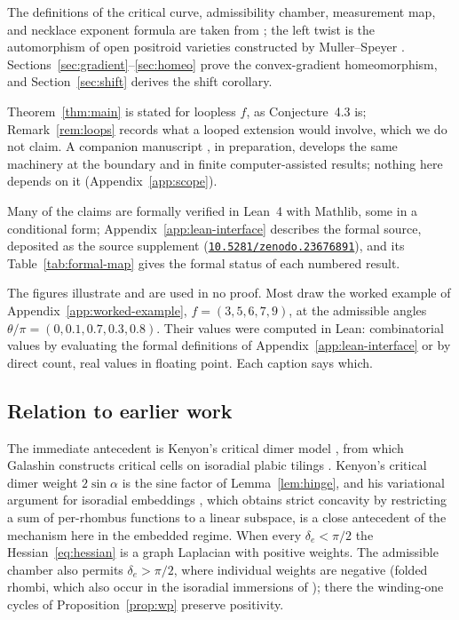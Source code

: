 \documentclass[11pt]{article}
\theoremstyle{definition}
\newcommand{\SourceSupplementRef}{\href{https://doi.org/10.5281/zenodo.23676891}{\nolinkurl{10.5281/zenodo.23676891}}}
\begin{document}
The definitions of the critical curve, admissibility chamber, measurement map, and necklace exponent
formula are taken from \cite{Galashin}; the left twist is the automorphism of open positroid varieties
constructed by Muller--Speyer \cite{MullerSpeyer}. Sections~\ref{sec:gradient}--\ref{sec:homeo} prove
the convex-gradient homeomorphism, and Section~\ref{sec:shift} derives the shift corollary.

Theorem~\ref{thm:main} is stated for loopless $f$, as Conjecture~4.3 is; Remark~\ref{rem:loops} records what a
looped extension would involve, which we do not claim. A companion manuscript \cite{GuetzBoundary}, in
preparation, develops the same machinery at the boundary and in finite computer-assisted results; nothing here
depends on it (Appendix~\ref{app:scope}).

Many of the claims are formally verified in Lean~4 with Mathlib, some in a conditional form;
Appendix~\ref{app:lean-interface} describes the formal source, deposited as the source supplement
(\SourceSupplementRef), and its Table~\ref{tab:formal-map} gives the formal status of each numbered result.

The figures illustrate and are used in no proof. Most draw the worked example of
Appendix~\ref{app:worked-example}, $f=(3,5,6,7,9)$, at the admissible angles
$\theta/\pi=(0,0.1,0.7,0.3,0.8)$. Their values were computed in Lean: combinatorial values by evaluating
the formal definitions of Appendix~\ref{app:lean-interface} or by direct count, real values in
floating point. Each caption says which.

\subsection*{Relation to earlier work}
The immediate antecedent is Kenyon's critical dimer model \cite{Kenyon}, from which Galashin constructs critical
cells on isoradial plabic tilings \cite[Introduction and \S1.2]{Galashin}. Kenyon's critical dimer weight
$2\sin\alpha$ \cite[\S2.3]{Kenyon} is the sine factor of Lemma~\ref{lem:hinge}, and his variational argument for
isoradial embeddings \cite[\S8]{Kenyon}, which obtains strict concavity by restricting a sum of per-rhombus
functions to a linear subspace, is a close antecedent of the mechanism here in the embedded regime. When every
$\delta_e<\pi/2$ the Hessian~\eqref{eq:hessian} is a graph Laplacian with positive weights. The admissible chamber
also permits $\delta_e>\pi/2$, where individual weights are negative (folded rhombi, which also occur in the
isoradial immersions of \cite{BoutillierCimasoniDeTiliere}); there the winding-one cycles of
Proposition~\ref{prop:wp} preserve positivity.
\end{document}
